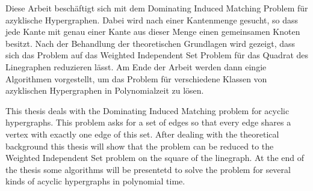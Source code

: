 \begin{abstractFrame}

\begin{deAbstract}
Diese Arbeit beschäftigt sich mit dem Dominating Induced Matching Problem für azyklische Hypergraphen. Dabei wird nach einer Kantenmenge gesucht, so dass jede Kante mit genau einer Kante aus dieser Menge einen gemeinsamen Knoten besitzt. Nach der Behandlung der theoretischen Grundlagen wird gezeigt, dass sich das Problem auf das Weighted Independent Set Problem für das Quadrat des Linegraphen reduzieren lässt. Am Ende der Arbeit werden dann eingie Algorithmen vorgestellt, um das Problem für verschiedene Klassen von azyklischen Hypergraphen in Polynomialzeit zu lösen.
\end{deAbstract}


\begin{enAbstract}
This thesis deals with the Dominating Induced Matching problem for acyclic hypergraphs. This problem asks for a set of edges so that every edge shares a vertex with exactly one edge of this set. After dealing with the theoretical background this thesis will show that the problem can be reduced to the Weighted Independent Set problem on the square of the linegraph. At the end of the thesis some algorithms will be presentetd to solve the problem for several kinds of acyclic hypergraphs in polynomial time.
\end{enAbstract}

\end{abstractFrame}